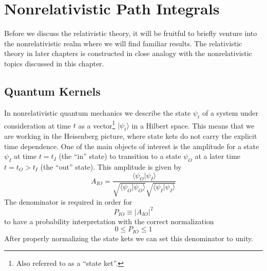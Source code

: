 \chapter{Nonrelativistic Path Integrals\label{ChNRPaths}}
Before we discuss the relativistic theory, it will be fruitful to briefly venture into the nonrelativistic realm where we will find familiar results. The relativistic theory in later chapters is constructed in close analogy with the nonrelativistic topics discussed in this chapter.
\section{Quantum Kernels\label{NRQuaKer}}
In nonrelativistic quantum mechanics we describe the state $\psi_{t}$ of a system under consideration at time $t$ as a vector\footnote{Also referred to as a ``state ket''.} $| \psi_{t} \rangle$ in a Hilbert space. This means that we are working in the Heisenberg picture, where state kets do not carry the explicit time dependence. One of the main objects of interest is the amplitude for a state $\psi_{I}$ at time $t = t_{I}$ (the ``in'' state) to transition to a state $\psi_{O}$ at a later time $t = t_{O} > t_{I}$ (the ``out'' state). This amplitude is given by
\begin{equation}
	A_{IO} = \frac{\langle \psi_{O} | \psi_{I} \rangle}{\sqrt{\langle \psi_{O}| \psi_{O} \rangle} \sqrt{\langle \psi_{I}| \psi_{I}\rangle}}
\end{equation}
The denominator is required in order for
\begin{equation}
	P_{IO} \equiv | A_{IO} |^{2}
\end{equation}
to have a probability interpretation with the correct normalization
\begin{equation}
	0 \leq P_{IO} \leq 1
\end{equation}
After properly normalizing the state kets we can set this denominator to unity.

